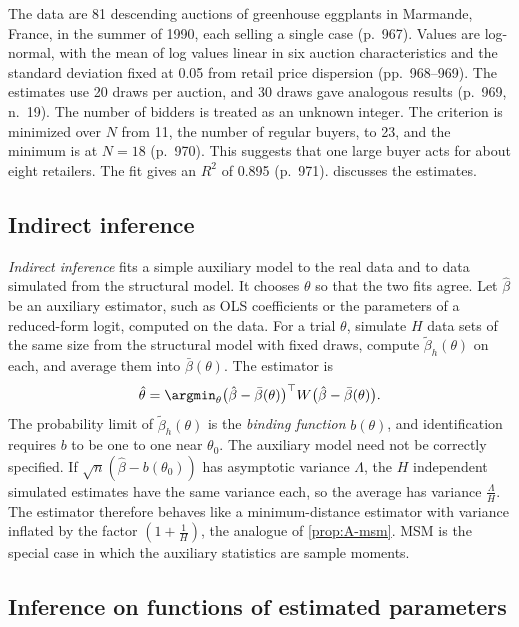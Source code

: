 The data are 81 descending auctions of greenhouse eggplants in Marmande, France, in the summer of 1990, each selling
a single case (p.~967). Values are log-normal, with the mean of log values linear in six auction characteristics and
the standard deviation fixed at 0.05 from retail price dispersion (pp.~968--969). The estimates use 20 draws per
auction, and 30 draws gave analogous results (p.~969, n.~19). The number of bidders is treated as an unknown integer.
The criterion is minimized over $N$ from 11, the number of regular buyers, to 23, and the minimum is at $N = 18$
(p.~970). This suggests that one large buyer acts for about eight retailers. The fit gives an $R^2$ of 0.895 (p.~971).
 discusses the estimates.

\subsection{Indirect inference}\label{sec:A-indirect}

\emph{Indirect inference} \citep{GourierouxMonfortRenault1993,Smith1993} fits a simple auxiliary model to the real
data and to data simulated from the structural model. It chooses $\theta$ so that the two fits agree. Let
$\hat\beta$ be an auxiliary estimator, such as OLS coefficients or the parameters of a reduced-form logit, computed
on the data. For a trial $\theta$, simulate $H$ data sets of the same size from the structural model with fixed
draws, compute $\tilde\beta_h(\theta)$ on each, and average them into $\bar\beta(\theta)$. The estimator is
\begin{equation*}
  \hat\theta = \argmin_\theta\bigl(\hat\beta - \bar\beta(\theta)\bigr)^\top W\bigl(\hat\beta - \bar\beta(\theta)\bigr).
\end{equation*}
The probability limit of $\tilde\beta_h(\theta)$ is the \emph{binding function} $b(\theta)$, and identification
requires $b$ to be one to one near $\theta_0$. The auxiliary model need not be correctly specified. If
$\sqrt n(\hat\beta - b(\theta_0))$ has asymptotic variance $\Lambda$, the $H$ independent simulated estimates have
the same variance each, so the average has variance $\frac{\Lambda}{H}$. The estimator therefore behaves like a
minimum-distance estimator with variance inflated by the factor $(1 + \frac{1}{H})$, the analogue of
\cref{prop:A-msm}. MSM is the special case in which the auxiliary statistics are sample moments.

\subsection{Inference on functions of estimated parameters}\label{sec:A-krinsky-robb}

